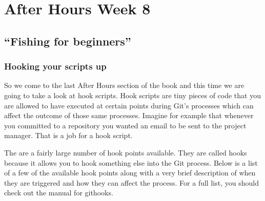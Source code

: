 \chapter{After Hours Week 8}
\section{``Fishing for beginners''}
\subsection{Hooking your scripts up}
So we come to the last After Hours section of the book and this time we are going to take a look at hook scripts.
Hook scripts are tiny pieces of code that you are allowed to have executed at certain points during Git's processes which can affect the outcome of those same processes.
Imagine for example that whenever you committed to a repository you wanted an email to be sent to the project manager.
That is a job for a hook script.

The are a fairly large number of hook points available.
They are called hooks because it allows you to hook something else into the Git process.
Below is a list of a few of the available hook points along with a very brief description of when they are triggered and how they can affect the process.
For a full list, you should check out the manual for githooks.

